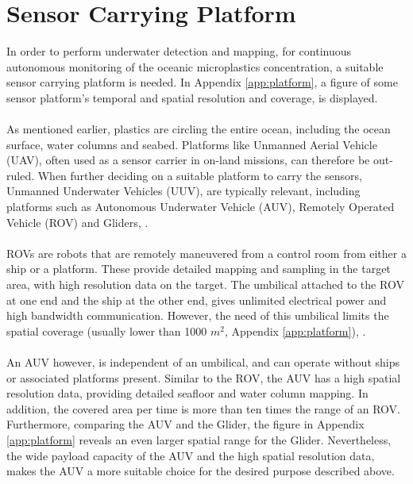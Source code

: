 

\section{Sensor Carrying Platform}

In order to perform underwater detection and mapping, for continuous autonomous monitoring of the oceanic microplastics concentration, a suitable sensor carrying platform is needed. %
In Appendix \ref{app:platform}, a figure of some sensor platform's temporal and spatial resolution and coverage, is displayed.
\\\\
As mentioned earlier, plastics are circling the entire ocean, including the ocean surface, water columns and seabed. Platforms like Unmanned Aerial Vehicle (UAV), often used as a sensor carrier in on-land missions, can therefore be out-ruled. When further deciding on a suitable platform to carry the sensors, Unmanned Underwater Vehicles (UUV), are typically relevant, including platforms such as Autonomous Underwater Vehicle (AUV), Remotely Operated Vehicle (ROV) and Gliders, \cite{nornes2017}.
\\\\
ROVs are robots that are remotely maneuvered from a control room from either a ship or a platform. These provide detailed mapping and sampling in the target area, with high resolution data on the target. The umbilical attached to the ROV at one end and the ship at the other end, gives unlimited electrical power and high bandwidth communication. However, the need of this umbilical limits the spatial coverage (usually lower than 1000 $m^2$, Appendix \ref{app:platform}), \cite{nornes2017}.
\\\\
An AUV however, is independent of an umbilical, and can operate without ships or associated platforms present. Similar to the ROV, the AUV has a high spatial resolution data, providing detailed seafloor and water column mapping. In addition, the covered area per time is more than ten times the range of an ROV. Furthermore, comparing the AUV and the Glider, the figure in Appendix \ref{app:platform} reveals an even larger spatial range for the Glider. Nevertheless, the wide payload capacity of the AUV and the high spatial resolution data, makes the AUV a more suitable choice for the desired purpose described above. 
